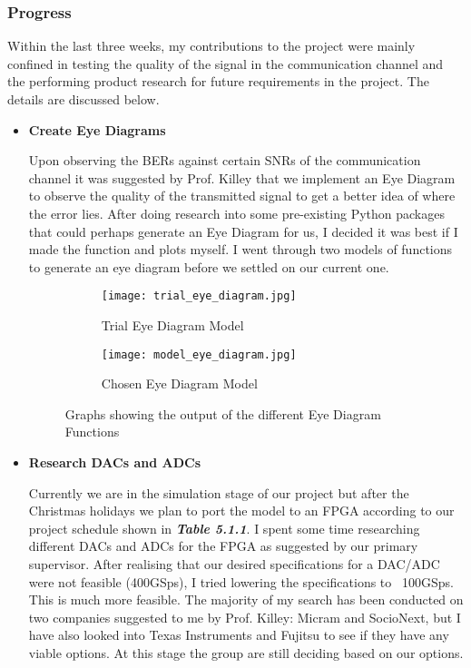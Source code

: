 
\subsubsection{Progress}
Within the last three weeks, my contributions to the project were mainly confined in testing the quality of the signal in the communication channel and the performing product research for future requirements in the project. The details are discussed below. 
\begin{itemize}
    \item \textbf{Create Eye Diagrams}
    
    Upon observing the BERs against certain SNRs of the communication channel it was suggested by Prof. Killey that we implement an Eye Diagram to observe the quality of the transmitted signal to get a better idea of where the error lies. After doing research into some pre-existing Python packages that could perhaps generate an Eye Diagram for us, I decided it was best if I made the function and plots myself. I went through two models of functions to generate an eye diagram before we settled on our current one.
    \begin{figure}[H]
        \begin{subfigure}[h]{0.53\linewidth}
            \texttt{[image: trial\_eye\_diagram.jpg]}
            \caption{Trial Eye Diagram Model}
        \end{subfigure}
        \begin{subfigure}[h]{0.53\linewidth}
            \texttt{[image: model\_eye\_diagram.jpg]}
            \caption{Chosen Eye Diagram Model}
        \end{subfigure}
        \caption{Graphs showing the output of the different Eye Diagram Functions}
    \end{figure}
    
    \item \textbf{Research DACs and ADCs}
    
    Currently we are in the simulation stage of our project but after the Christmas holidays we plan to port the model to an FPGA according to our project schedule shown in \textit{\textbf{Table 5.1.1}}. I spent some time researching different DACs and ADCs for the FPGA as suggested by our primary supervisor. After realising that our desired specifications for a DAC/ADC were not feasible (400GSps), I tried lowering the specifications to ~100GSps. This is much more feasible. The majority of my search has been conducted on two companies suggested to me by Prof. Killey: Micram and SocioNext, but I have also looked into Texas Instruments and Fujitsu to see if they have any viable options. At this stage the group are still deciding based on our options. 
\end{itemize}
